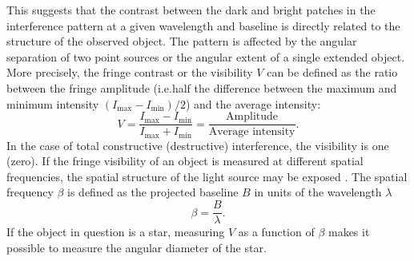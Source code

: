 This suggests that the contrast between the dark and bright patches in the interference pattern at a given wavelength and baseline is directly related to the structure of the observed object. 
The pattern is affected by the angular separation of two point sources or the angular extent of a single extended object. More precisely, the fringe contrast or the visibility $V$ can be defined as the ratio between the fringe amplitude (i.e.\@ half the difference between the maximum and minimum intensity $ (I_{\text{max}}-I_{\text{min}})/2$) and the average intensity:
\begin{equation}
V = \frac{I_{\text{max}}-I_{\text{min}}}{I_{\text{max}}+I_{\text{min}}} = \frac{\text{Amplitude}}{\text{Average intensity}}. 
\end{equation}
In the case of total constructive (destructive) interference, the visibility is one (zero).
If the fringe visibility of an object is measured at different spatial frequencies, the spatial structure of the light source may be exposed \citep{van1934wahrscheinliche,zernike1938concept}. The spatial frequency $\beta$ is defined as the projected baseline $B$ in units of the wavelength $\lambda$
\begin{equation}
\label{eq:spatialfreq}
\beta = \frac{B}{\lambda}.
\end{equation} 
If the object in question is a star, measuring $V$ as a function of $\beta$ makes it possible to measure the angular diameter of the star. 
